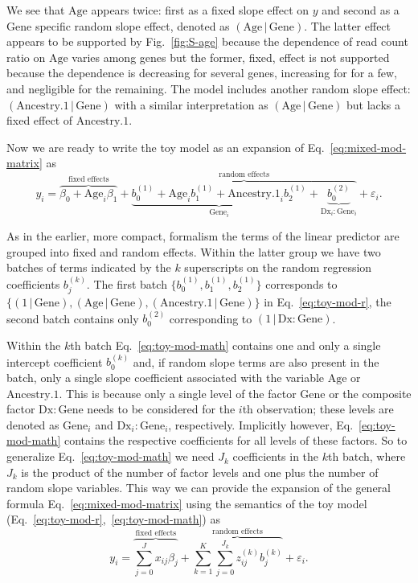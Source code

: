 \documentclass[letterpaper]{article}
\begin{document}
We see that \(\mathrm{Age}\) appears twice: first as a fixed slope effect on \(y\) and
second as a \(\mathrm{Gene}\) specific random slope effect, denoted as
\((\mathrm{Age}\,|\,\mathrm{Gene})\).  The latter effect appears to be
supported by Fig.~\ref{fig:S-age} because the dependence of read count ratio
on \(\mathrm{Age}\) varies among genes but the former, fixed, effect is not
supported because the dependence is decreasing for several genes, increasing for
for a few, and negligible for the remaining.  The model includes another
random slope effect: \((\mathrm{Ancestry.1}\,|\,\mathrm{Gene})\) with a
similar interpretation as \((\mathrm{Age}\,|\,\mathrm{Gene})\) but lacks a
fixed effect of \(\mathrm{Ancestry.1}\).

Now we are ready to write the toy model as an expansion of
Eq.~\ref{eq:mixed-mod-matrix} as
\begin{equation}
\label{eq:toy-mod-math}
y_{i} = \overbrace{\beta_0 + \mathrm{Age}_{i}
\beta_1}^{\text{fixed effects}} +
\overbrace{\underbrace{b_{0}^{(1)} + \mathrm{Age}_i b_1^{(1)} +
\mathrm{Ancestry.1}_i b_{2}^{(1)}}_{\mathrm{Gene}_i} +
\underbrace{b_{0}^{(2)}}_{\mathrm{Dx}_i:\mathrm{Gene}_i}}^{\text{random
effects}} + \varepsilon_i.
\end{equation}

As in the earlier, more compact, formalism the terms of the linear predictor
are grouped into fixed and random effects.  Within the latter group we have
two batches of terms indicated by the \(k\) superscripts on the random
regression coefficients \(b_j^{(k)}\).  The first batch
\(\{b_0^{(1)},b_1^{(1)},b_2^{(1)}\}\) corresponds to
\(\{(1\,|\,\mathrm{Gene}), (\mathrm{Age}\,|\,\mathrm{Gene}),
(\mathrm{Ancestry.1}\,|\,\mathrm{Gene})\}\) in Eq.~\ref{eq:toy-mod-r}, the
second batch contains only \(b_0^{(2)}\) corresponding to
\((1\,|\,\mathrm{Dx}:\mathrm{Gene})\).

Within the \(k\)th batch Eq.~\ref{eq:toy-mod-math} contains one and only a
single intercept coefficient \(b_0^{(k)}\) and, if random slope terms are also
present in the batch, only a single slope coefficient associated with the
variable \(\mathrm{Age}\) or \(\mathrm{Ancestry.1}\).  This is because only a
single level of the factor \(\mathrm{Gene}\) or the composite factor
\(\mathrm{Dx}:\mathrm{Gene}\) needs to be considered for the \(i\)th
observation; these levels are denoted as \(\mathrm{Gene}_i\) and
\(\mathrm{Dx}_i:\mathrm{Gene}_i\), respectively.  Implicitly however,
Eq.~\ref{eq:toy-mod-math} contains the respective coefficients for all levels
of these factors.  So to generalize Eq.~\ref{eq:toy-mod-math} we need \(J_k\)
coefficients in the \(k\)th batch, where \(J_k\) is the product of the number
of factor levels and one plus the number of random slope variables.  This way we
can provide the expansion of the general formula Eq.~\ref{eq:mixed-mod-matrix}
using the semantics of the toy model
(Eq.~\ref{eq:toy-mod-r},~\ref{eq:toy-mod-math})
as
\begin{equation}
y_i = \overbrace{\sum_{j=0}^J x_{ij} \beta_j}^{\text{fixed effects}} +
\overbrace{\sum_{k=1}^K \sum_{j=0}^{J_k} z_{ij}^{(k)}
b_{j}^{(k)}}^{\text{random effects}} + \varepsilon_i.
\end{equation}
\end{document}
